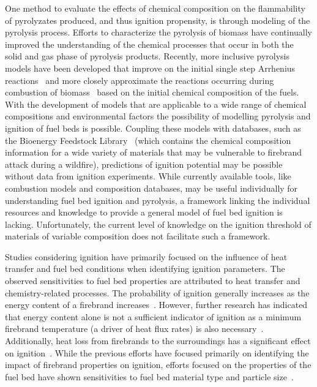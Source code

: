     One method to evaluate the effects of chemical composition on the flammability of pyrolyzates produced, and thus ignition propensity, is through modeling of the pyrolysis process. Efforts to characterize the pyrolysis of biomass have continually improved the understanding of the chemical processes that occur in both the solid and gas phase of pyrolysis products. Recently, more inclusive pyrolysis models have been developed that improve on the initial single step Arrhenius reactions~\cite{DIBLASI199371} and more closely approximate the reactions occurring during combustion of biomass~\cite{Ranzi2008, Debiagi2015, Dhahak2019} based on the initial chemical composition of the fuels. With the development of models that are applicable to a wide range of chemical compositions and environmental factors the possibility of modelling pyrolysis and ignition of fuel beds is possible. Coupling these models with databases, such as the Bioenergy Feedstock Library~\cite{feedstock} (which contains the chemical composition information for a wide variety of materials that may be vulnerable to firebrand attack during a wildfire), predictions of ignition potential may be possible without data from ignition experiments. While currently available tools, like combustion models and composition databases, may be useful individually for understanding fuel bed ignition and pyrolysis, a framework linking the individual resources and knowledge to provide a general model of fuel bed ignition is lacking. Unfortunately, the current level of knowledge on the ignition threshold of materials of variable composition does not facilitate such a framework.
    
  Studies considering ignition have primarily focused on the influence of heat transfer and fuel bed conditions when identifying ignition parameters. The observed sensitivities to fuel bed properties are attributed to heat transfer and chemistry-related processes. The probability of ignition generally increases as the energy content of a firebrand increases~\cite{Hadden2011}. However, further research has indicated that energy content alone is not a sufficient indicator of ignition as a minimum firebrand temperature (a driver of heat flux rates) is also necessary~\cite{Zak2014}. Additionally, heat loss from firebrands to the surroundings has a significant effect on ignition~\cite{Fernandez-Pello2015}. While the previous efforts have focused primarily on identifying the impact of firebrand properties on ignition, efforts focused on the properties of the fuel bed have shown sensitivities to fuel bed material type and particle size~\cite{Urban2018}. 

